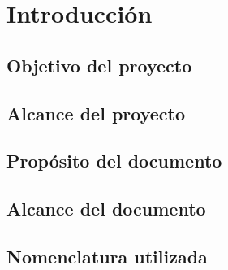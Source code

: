 \chapter{Introducción}


\section{Objetivo del proyecto} 
		

\section{Alcance del proyecto}


\section{Propósito del documento}
	

\section{Alcance del documento}


\section{Nomenclatura utilizada}



